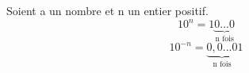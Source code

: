 Soient a un nombre et n un entier positif.
$$10^n=1\underbrace{0...0}_\text{n fois}$$
$$10^{-n}=\underbrace{0,0...0}_\text{n fois}1$$